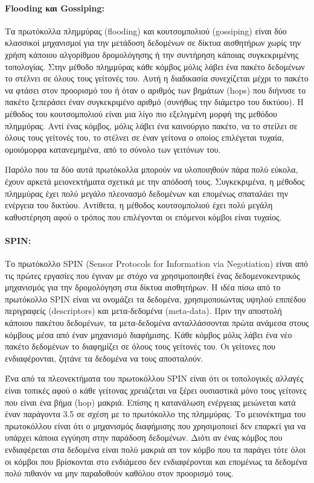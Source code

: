 \paragraph{Flooding και Gossiping:} Τα πρωτόκολλα πλημμύρας (flooding) και κουτσομπολιού (gossiping) \cite{gossiping} είναι δύο κλασσικοί μηχανισμοί για την μετάδοση
δεδομένων σε δίκτυα αισθητήρων χωρίς την χρήση κάποιου αλγορίθμου δρομολόγησης ή την συντήρηση κάποιας συγκεκριμένης τοπολογίας.
Στην μέθοδο πλημμύρας κάθε κόμβος μόλις λάβει ένα πακέτο δεδομένων το στέλνει σε όλους τους γείτονές του. Αυτή η διαδικασία συνεχίζεται μέχρι το πακέτο να φτάσει
στον προορισμό του ή όταν ο αριθμός των βημάτων (hops) που διήνυσε το πακέτο ξεπεράσει έναν συγκεκριμένο αριθμό (συνήθως την διάμετρο του δικτύου). Η μέθοδος του
κουτσομπολιού είναι μια λίγο πιο εξελιγμένη μορφή της μεθόδου πλημμύρας. Αντί ένας κόμβος, μόλις λάβει ένα καινούργιο πακέτο, να το στείλει σε όλους τους γείτονές
του,
το στέλνει σε έναν γείτονα ο οποίος επιλέγεται τυχαία, ομοιόμορφα κατανεμημένα, από το σύνολο των γειτόνων του.

Παρόλο που τα δύο αυτά πρωτόκολλα μπορούν να υλοποιηθούν πάρα πολύ εύκολα, έχουν αρκετά μειονεκτήματα σχετικά με την απόδοσή τους. Συγκεκριμένα, η μέθοδος
πλημμύρας έχει πολύ μεγάλο πλεονασμό δεδομένων και επομένως σπαταλάει την ενέργεια του δικτύου. Αντίθετα, η μέθοδος κουτσομπολιού έχει πολύ μεγάλη καθυστέρηση αφού ο
τρόπος που επιλέγονται οι επόμενοι κόμβοι είναι τυχαίος.

\paragraph{SPIN:} Το πρωτόκολλο SPIN (Sensor Protocols for Information via Negotiation) \cite{spin_protocol} είναι από τις πρώτες εργασίες που έγιναν με στόχο να
χρησιμοποιηθεί ένας δεδομενοκεντρικός μηχανισμός για την δρομολόγηση στα δίκτυα αισθητήρων. Η ιδέα πίσω από το πρωτόκολλο SPIN είναι να ονομάζει τα δεδομένα,
χρησιμοποιώντας υψηλού επιπέδου περιγραφείς (descriptors) και μετα-δεδομένα (meta-data). Πριν την αποστολή κάποιου πακέτου δεδομένων, τα μετα-δεδομένα ανταλλάσσονται
πρώτα ανάμεσα στους κόμβους μέσα από έναν μηχανισμό διαφήμισης. Κάθε κόμβος μόλις λάβει ένα νέο πακέτο δεδομένων το διαφημίζει σε όλους τους γείτονές του. Οι γείτονες
που ενδιαφέρονται, ζητάνε τα δεδομένα να τους αποσταλούν.

Ένα από τα πλεονεκτήματα του πρωτοκόλλου SPIN είναι ότι οι τοπολογικές αλλαγές είναι τοπικές αφού ο κάθε γείτονας χρειάζεται να ξέρει ουσιαστικά μόνο τους γείτονες
που είναι ένα βήμα (hop) μακριά. Επίσης η κατανάλωση ενέργειας μειώνεται κατά έναν παράγοντα 3.5 \cite{spin_protocol} σε σχέση με το πρωτόκολλο της πλημμύρας. Το
μειονέκτημα του πρωτοκόλλου είναι ότι ο μηχανισμός διαφήμισης που χρησιμοποιεί δεν επαρκεί για να υπάρχει κάποια εγγύηση στην παράδοση δεδομένων. Διότι αν ένας κόμβος
που ενδιαφέρεται στα δεδομένα είναι πολύ μακριά απ τον κόμβο που τα παράγει τότε όλοι οι κόμβοι που βρίσκονται στο ενδιάμεσο δεν ενδιαφέρονται και επομένως τα
δεδομένα πολύ πιθανόν να μην παραδοθούν καθόλου στον προορισμό τους.

